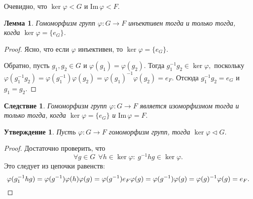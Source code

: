 \documentclass[a4paper, 14pt]{extarticle}
\newcommand{\n}{\par}
\newcommand{\suchthat}{{:}{ } \ }
\newcommand{\im}{\mathrm{Im} \,}
\renewcommand{\phi}{\varphi}
\theoremstyle{definition}
\theoremstyle{plain}
\numberwithin{theorem}{section}
\numberwithin{definition}{section}
\newtheorem{statement}{Утверждение}
\numberwithin{statement}{section}
\newtheorem{lemma}{Лемма}
\numberwithin{lemma}{section}
\newtheorem*{consequence*}{Следствие}
\numberwithin{consequence}{section}
\begin{document}
	Очевидно, что $\ker \phi < G$ и Im$\, \phi < F.$
	\begin{lemma}
		Гомоморфизм групп ${\phi: G \rightarrow F}$ инъективен тогда и только тогда, когда  $\ker \phi = \{e_G\}$.
	\end{lemma}
	\begin{proof}
		Ясно, что если $\phi$ инъективен, то $\ker \phi = \{e_G\}.$ \n
		Обратно, пусть ${g_1, g_2 \in G}$ и ${\phi(g_1) = \phi(g_2).}$ Тогда ${g^{-1}_1g_2 \in \ker \phi,}$ поскольку ${\phi(g^{-1}_1g_2) = \phi(g^{-1}_1) \phi(g_2) = \phi(g_1)^{-1} \phi(g_2) = e_F.}$ Отсюда $g^{-1}_1g_2 = e_G$ и $g_1 = g_2.$
	\end{proof}
	\begin{consequence*}
		Гомоморфизм групп ${\phi: G \rightarrow F}$ является изоморфизмом тогда и только тогда, когда ${\ker \phi = \{e_G\}}$ и ${\im \phi = F.}$
	\end{consequence*}
	\begin{statement}
		Пусть ${\phi: G \rightarrow F}$ гомоморфизм групп, тогда ${\ker \phi \lhd G.}$
	\end{statement}
	\begin{proof}
		Достаточно проверить, что
		\begin{equation*}
			\forall g \in G \ \ \forall h \in \ker \phi\suchthat g^{-1}hg \in \ker \phi.
		\end{equation*}
		Это следует из цепочки равенств:
		\begin{equation*}
			\phi(g^{-1}_1hg) = \phi(g^{-1}) \phi(h) \phi(g) = \phi(g^{-1}) e_F \phi(g) = \phi(g^{-1}) \phi(g) = \phi(g)^{-1} \phi(g) = e_F. \qedhere
		\end{equation*}
	\end{proof}
        \newpage
    
	\newpage
\end{document}
